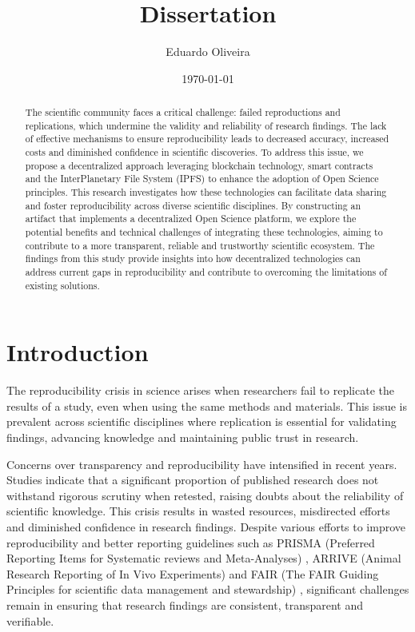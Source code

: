\documentclass{article}
\title{Dissertation}
\author{Eduardo Oliveira}
\date{\today}
\begin{document}
\maketitle

\begin{abstract}
    The scientific community faces a critical challenge: failed reproductions and replications, which undermine the validity and reliability of research findings. The lack of effective mechanisms to ensure reproducibility leads to decreased accuracy, increased costs and diminished confidence in scientific discoveries. To address this issue, we propose a decentralized approach leveraging blockchain technology, smart contracts and the  InterPlanetary File System (IPFS) to enhance the adoption of Open Science principles. This research investigates how these technologies can facilitate data sharing and foster reproducibility across diverse scientific disciplines. By constructing an artifact that implements a decentralized Open Science platform, we explore the potential benefits and technical challenges of integrating these technologies, aiming to contribute to a more transparent, reliable and trustworthy scientific ecosystem. The findings from this study provide insights into how decentralized technologies can address current gaps in reproducibility and contribute to overcoming the limitations of existing solutions.
\end{abstract}


\section{Introduction}


The reproducibility crisis in science arises when researchers fail to replicate the results of a study, even when using the same methods and materials. This issue is prevalent across scientific disciplines where replication is essential for validating findings, advancing knowledge and maintaining public trust in research.

Concerns over transparency and reproducibility have intensified in recent years. Studies indicate that a significant proportion of published research does not withstand rigorous scrutiny when retested, raising doubts about the reliability of scientific knowledge. This crisis results in wasted resources, misdirected efforts and diminished confidence in research findings. Despite various efforts to improve reproducibility and better reporting guidelines such as PRISMA (Preferred Reporting Items for Systematic reviews and Meta-Analyses) \cite{Pagen71}, ARRIVE (Animal Research Reporting of In Vivo Experiments) \cite{percie2020arrive} and FAIR (The FAIR Guiding Principles for scientific data management and stewardship) \cite{wilkinson2016fair}, significant challenges remain in ensuring that research findings are consistent, transparent and verifiable.
\end{document}
